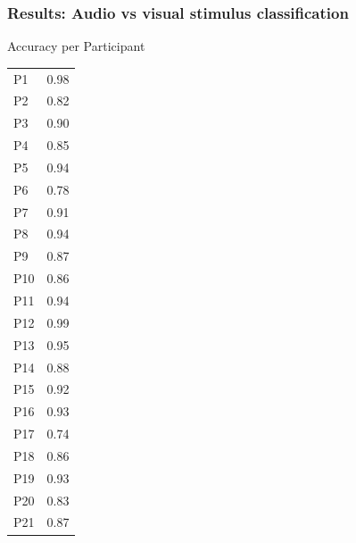 \documentclass{beamer}
\begin{document}
\begin{frame}
	\frametitle{Results: Audio vs visual stimulus classification}

	\begin{multicols}{2}
		Accuracy per Participant
		\begin{tabular}{l|l}
			P1 & 0.98 \\
			P2 & 0.82 \\
			P3 & 0.90 \\
			P4 & 0.85 \\
			P5 & 0.94 \\
			P6 & 0.78 \\
			P7 & 0.91 \\
			P8 & 0.94 \\
			P9 & 0.87 \\
			P10 & 0.86 \\
			P11 & 0.94 \\
			P12 & 0.99 \\
			P13 & 0.95 \\
			P14 & 0.88 \\
			P15 & 0.92 \\
			P16 & 0.93 \\
			P17 & 0.74 \\
			P18 & 0.86 \\
			P19 & 0.93 \\
			P20 & 0.83 \\
			P21 & 0.87 \\
		\end{tabular}
		\columnbreak

	\end{multicols}

\end{frame}
\end{document}
